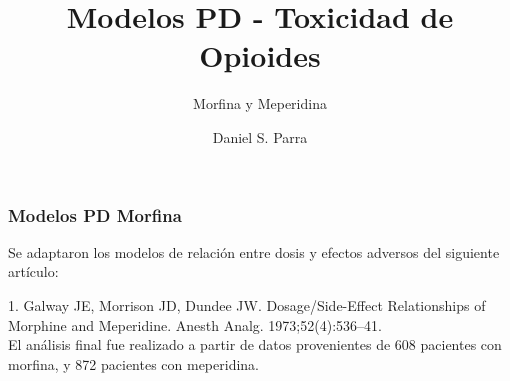 \documentclass[10pt]{beamer}
\begin{document}
	\author{Daniel S. Parra}
	\title{Modelos PD - Toxicidad de Opioides}
	\subtitle{Morfina y Meperidina}
	\begin{frame}[plain]
		\maketitle
	\end{frame}
	
	\begin{frame}
		\frametitle{Modelos PD Morfina}
		Se adaptaron los modelos de relación entre dosis y efectos adversos del siguiente artículo:\\
		\vspace{1.2cm}
		
		1. Galway JE, Morrison JD, Dundee JW. Dosage/Side-Effect Relationships of Morphine and Meperidine. Anesth Analg. 1973;52(4):536–41. \\
		
		\vspace{1.2cm}
		El análisis final fue realizado a partir de datos provenientes de 608 pacientes con morfina, y 872 pacientes con meperidina. 
	\end{frame}
	
\end{document}
